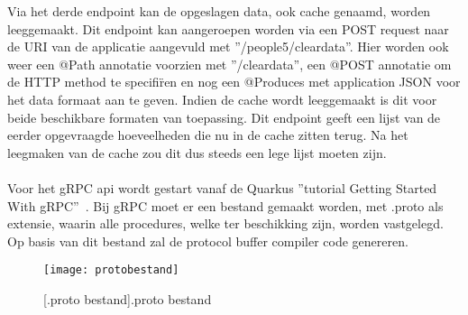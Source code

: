 Via het derde endpoint kan de opgeslagen data, ook cache genaamd, worden leeggemaakt. Dit endpoint kan aangeroepen worden via een POST request naar
de URI van de applicatie aangevuld met ''/people5/cleardata''. Hier worden ook weer een @Path annotatie voorzien met ''/cleardata'', een @POST annotatie om de HTTP method te
specifi\"ren en nog een @Produces met application JSON voor het data formaat aan te geven. Indien de cache wordt leeggemaakt is dit voor beide beschikbare formaten van toepassing.
Dit endpoint geeft een lijst van de eerder opgevraagde hoeveelheden die nu in de cache zitten terug.
Na het leegmaken van de cache zou dit dus steeds een lege lijst moeten zijn.\newline
~\autocite{quarkusREST}\\
~\autocite{Jakarta}\\

Voor het gRPC api wordt gestart vanaf de Quarkus ''tutorial Getting Started With gRPC''~\parencite{quarkusgRPC}.
Bij gRPC moet er een bestand gemaakt worden, met .proto als extensie, waarin alle procedures, welke ter beschikking zijn, worden vastgelegd.
Op basis van dit bestand zal de protocol buffer compiler code genereren.

\begin{figure}[ht]
    \centering
    \texttt{[image: protobestand]}
    \caption{[.proto bestand].proto bestand}
\end{figure}


